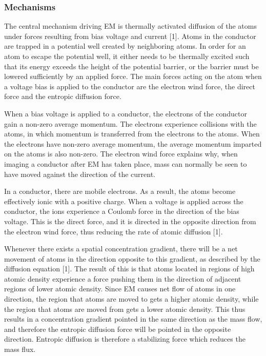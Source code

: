 \subsubsection{Mechanisms}
The central mechanism driving EM is thermally activated diffusion of the atoms under forces resulting from bias voltage and current [1]. Atoms in the conductor are trapped in a potential well created by neighboring atoms. In order for an atom to escape the potential well, it either needs to be thermally excited such that its energy exceeds the height of the potential barrier, or the barrier must be lowered sufficiently by an applied force. The main forces acting on the atom when a voltage bias is applied to the conductor are the electron wind force, the direct force and the entropic diffusion force. 

When a bias voltage is applied to a conductor, the electrons of the conductor gain a non-zero average momentum. The electrons experience collisions with the atoms, in which momentum is transferred from the electrons to the atoms. When the electrons have non-zero average momentum, the average momentum imparted on the atoms is also non-zero. The electron wind force explains why, when imaging a conductor after EM has taken place, mass can normally be seen to have moved against the direction of the current.  

In a conductor, there are mobile electrons. As a result, the atoms become effectively ionic with a positive charge. When a voltage is applied across the conductor, the ions experience a Coulomb force in the direction of the bias voltage. This is the direct force, and it is directed in the opposite direction from the electron wind force, thus reducing the rate of atomic diffusion [1].

Whenever there exists a spatial concentration gradient, there will be a net movement of atoms in the direction opposite to this gradient, as described by the diffusion equation [1]. The result of this is that atoms located in regions of high atomic density experience a force pushing them in the direction of adjacent regions of lower atomic density. Since EM causes net flow of atoms in one direction, the region that atoms are moved to gets a higher atomic density, while the region that atoms are moved from gets a lower atomic density. This thus results in a concentration gradient pointed in the same direction as the mass flow, and therefore the entropic diffusion force will be pointed in the opposite direction. Entropic diffusion is therefore a stabilizing force which reduces the mass flux. 


